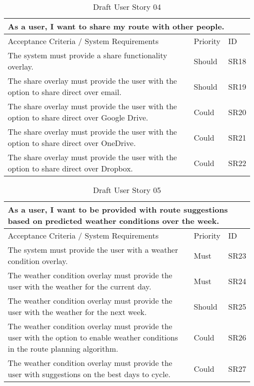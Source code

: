 \begin{table}[!htb]
\caption{Draft User Story 04}
\label{appendix:tab:user-story-04}
\begin{tabular}{ p{11cm} p{1cm}  p{1cm} }
\hline
\multicolumn{3}{p{13cm}}{As a user, I want to share my route with other people.}\\ 
\hline
Acceptance Criteria / System Requirements & Priority & ID\\
\hline
The system must provide a share functionality overlay. & Should & SR18 \\
The share overlay must provide the user with the option to share direct over email. & Should & SR19\\
The share overlay must provide the user with the option to share direct over Google Drive. & Could & SR20\\ 
The share overlay must provide the user with the option to share direct over OneDrive. & Could & SR21\\ 
The share overlay must provide the user with the option to share direct over Dropbox. & Could & SR22\\ 
\hline
\end{tabular}
\end{table}

\begin{table}[!htb]
\caption{Draft User Story 05}
\label{appendix:tab:user-story-05}
\begin{tabular}{ p{11cm} p{1cm}  p{1cm} }
\hline
\multicolumn{3}{p{13cm}}{As a user, I want to be provided with route suggestions based on predicted weather conditions over the week.}\\ 
\hline
Acceptance Criteria / System Requirements & Priority & ID\\
\hline
The system must provide the user with a weather condition overlay. & Must & SR23 \\
The weather condition overlay must provide the user with the weather for the current day. & Must & SR24\\
The weather condition overlay must provide the user with the weather for the next week. & Should & SR25\\
The weather condition overlay must provide the user with the option to enable weather conditions in the route planning algorithm. & Could & SR26\\ 
The weather condition overlay must provide the user with suggestions on the best days to cycle. & Could & SR27\\ 
\hline
\end{tabular}
\end{table}

